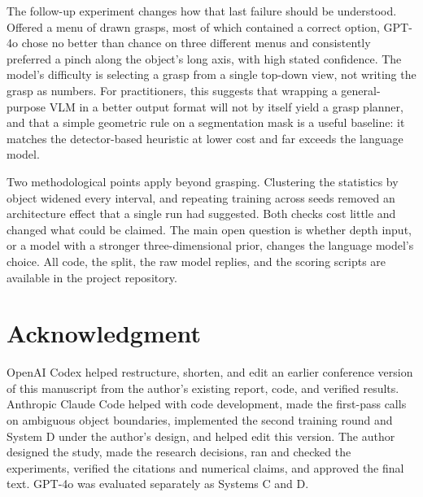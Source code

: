 \documentclass[10pt,conference,compsoc]{IEEEtran}
\begin{document}
The follow-up experiment changes how that last failure should be understood.
Offered a menu of drawn grasps, most of which contained a correct option,
GPT-4o chose no better than chance on three different menus and consistently
preferred a pinch along the object's long axis, with high stated confidence.
The model's difficulty is selecting a grasp from a single top-down view, not
writing the grasp as numbers. For practitioners, this suggests that wrapping
a general-purpose VLM in a better output format will not by itself yield a
grasp planner, and that a simple geometric rule on a segmentation mask is a
useful baseline: it matches the detector-based heuristic at lower cost and
far exceeds the language model.

Two methodological points apply beyond grasping. Clustering the statistics by
object widened every interval, and repeating training across seeds removed an
architecture effect that a single run had suggested. Both checks cost little
and changed what could be claimed. The main open question is whether depth
input, or a model with a stronger three-dimensional prior, changes the
language model's choice. All code, the split, the raw model replies, and the
scoring scripts are available in the project repository.

\section*{Acknowledgment}

OpenAI Codex helped restructure, shorten, and edit an earlier conference
version of this manuscript from the author's existing report, code, and
verified results. Anthropic Claude Code helped with code development, made
the first-pass calls on ambiguous object boundaries, implemented the second
training round and System D under the author's design, and helped edit this
version. The author designed the study, made the research decisions, ran and
checked the experiments, verified the citations and numerical claims, and
approved the final text. GPT-4o was evaluated separately as Systems C and D.
\end{document}
